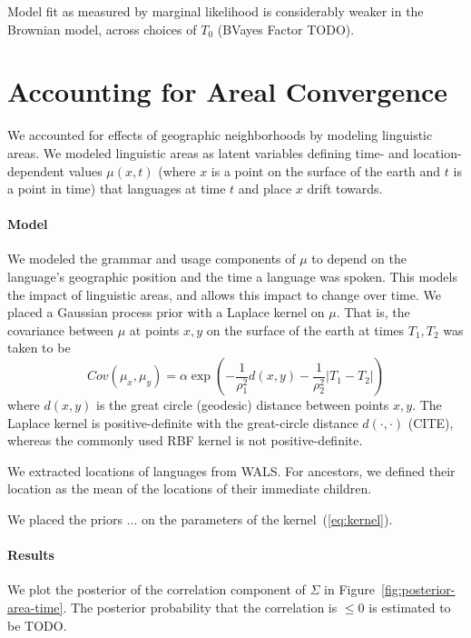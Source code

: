 \documentclass[11pt,a4paper]{article}
\begin{document}
Model fit as measured by marginal likelihood is considerably weaker in the Brownian model, across choices of $T_0$ (BVayes Factor TODO).



\section{Accounting for Areal Convergence}
We accounted for effects of geographic neighborhoods by modeling linguistic areas.
We modeled linguistic areas as latent variables defining time- and location-dependent values $\mu(x,t)$ (where $x$ is a point on the surface of the earth and $t$ is a point in time) that languages at time $t$ and place $x$ drift towards.

\paragraph{Model}
We modeled the grammar and usage components of $\mu$ to depend on the language's geographic position and the time a language was spoken.
This models the impact of linguistic areas, and allows this impact to change over time.
We placed a Gaussian process prior with a Laplace kernel on $\mu$.
That is, the covariance between $\mu$ at points $x, y$ on the surface of the earth at times $T_1, T_2$ was taken to be
\begin{equation}\label{eq:kernel}
    Cov(\mu_x, \mu_y) = \alpha \exp\left(-\frac{1}{\rho^2_1} d(x,y) - \frac{1}{\rho_2^2} |T_1-T_2|\right)
\end{equation}
where $d(x,y)$ is the great circle (geodesic) distance between points $x, y$.
The Laplace kernel is positive-definite with the great-circle distance $d(\cdot, \cdot)$ (CITE), whereas the commonly used RBF kernel is not positive-definite.

We extracted locations of languages from WALS.
For ancestors, we defined their location as the mean of the locations of their immediate children.

We placed the priors ... on the parameters of the kernel~(\ref{eq:kernel}).

\paragraph{Results}
We plot the posterior of the correlation component of $\Sigma$ in Figure~\ref{fig:posterior-area-time}.
The posterior probability that the correlation is $\leq 0$ is estimated to be TODO.
\end{document}
